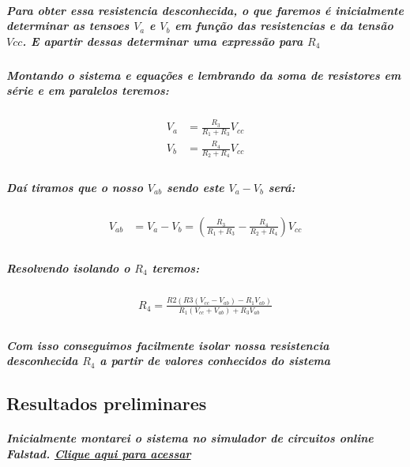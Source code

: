 \documentclass[12pt,twoside, a4paper, twocolumn]{article}
\begin{document}
\subparagraph*{Para obter essa resistencia desconhecida, o que faremos é inicialmente determinar as tensoes $V_a$ e $V_b$ em função das resistencias e da tensão $Vcc$. E apartir dessas determinar uma expressão para $R_4$ }

\subparagraph*{Montando o sistema e equações e lembrando da soma de resistores em série e em paralelos teremos: }

\begin{equation}
    \begin{aligned}
        V_{a} & = \frac{R_3}{R_1+R_3}V_{cc} \\
        V_{b} & = \frac{R_4}{R_2+R_4}V_{cc} \\
    \end{aligned}
\end{equation}

\subparagraph*{Daí tiramos que o nosso $V_{ab}$ sendo este $V_a - V_b$ será:}

\begin{equation}
    \begin{aligned}
        V_{ab} & = V_{a} - V_{b} = \left(\frac{R_3}{R_1+R_3} - \frac{R_4}{R_2+R_4}\right)V_{cc} \\
    \end{aligned}
\end{equation}

\subparagraph*{Resolvendo isolando o $R_4$ teremos:}

\begin{equation}
    \begin{aligned}
        R_4 = \frac{R2(R3(V_{cc} - V_{ab}) - R_1V_{ab})}{R_1 (V_{cc} + V_{ab}) +R_3V_{ab}} \\
    \end{aligned}
\end{equation}

\subparagraph*{Com isso conseguimos facilmente isolar nossa resistencia desconhecida $R_4$ a partir de valores conhecidos do sistema}

\subsection{Resultados preliminares}


\subparagraph*{ Inicialmente montarei o sistema no simulador de circuitos online Falstad. \href{https://www.falstad.com/circuit/circuitjs.html?ctz=CQAgjCAMB0l3BWcMBMcUHYMGZIA4UA2ATmIxAUgoqoQFMBaMMAKADcQUAWKlPPTjxDFCUMULBUpUaAhYB3QVREhsCFMNGQFq9ZpBcuAldoBOBo-sMCwhaVwzwd18HYsCU3KC3MvPXd05+MUknRT9g7l5gs10NFTUNMAwtcEo4HUTwFLjOL1is-yUggV40DIAHXKK-LwgpFiqXWypagPrvIA}{Clique aqui para acessar}}
\end{document}
